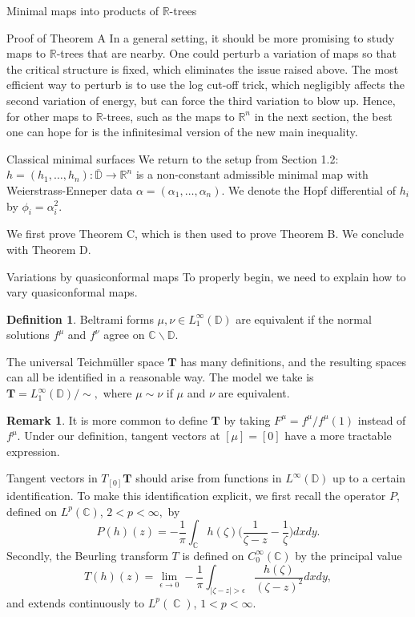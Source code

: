 \documentclass[10pt]{amsart}
\newcommand{\R}{\mathbb R}
\DeclareMathOperator{\C}{\mathbb{C}}
\theoremstyle{definition}
\newtheorem{defn}[thm]{Definition}
\newtheorem{remark}[thm]{Remark}
\begin{document}
\begin{section}{Minimal maps into products of $\R$-trees}
\begin{subsection}{Proof of Theorem A}
In a general setting, it should be more promising to study maps to $\R$-trees that are nearby. One could perturb a variation of maps so that the critical structure is fixed, which eliminates the issue raised above. The most efficient way to perturb is to use the log cut-off trick, which negligibly affects the second variation of energy, but can force the third variation to blow up. Hence, for other maps to $\R$-trees, such as the maps to $\R^n$ in the next section, the best one can hope for is the infinitesimal version of the new main inequality.
\end{subsection}


\end{section}

\begin{section}{Classical minimal surfaces}\label{r3}
We return to the setup from Section 1.2: $h=(h_1,\dots, h_n):\overline{\mathbb{D}}\to\R^n$ is a non-constant admissible minimal map with Weierstrass-Enneper data $\alpha=(\alpha_1,\dots,\alpha_n)$. We denote the Hopf differential of $h_i$ by $\phi_i=\alpha_i^2.$

We first prove Theorem C, which is then used to prove Theorem B. We conclude with Theorem D. 
\begin{subsection}{Variations by quasiconformal maps}
To properly begin, we need to explain how to vary quasiconformal maps.
\begin{defn}
Beltrami forms $\mu,\nu\in L_1^\infty(\mathbb{D})$ are equivalent if the normal solutions $f^\mu$ and $f^\nu$ agree on $\mathbb{C}\backslash\mathbb{D}.$
\end{defn}
The universal Teichm{\"u}ller space $\mathbf{T}$ has many definitions, and the resulting spaces can all be identified in a reasonable way. The model we take is $\mathbf{T}=L_1^\infty(\mathbb{D})/\sim,$ where $\mu\sim \nu$ if $\mu$ and $\nu$ are equivalent.
\begin{remark}
It is more common to define $\mathbf{T}$ by taking $F^\mu=f^\mu/f^\mu(1)$ instead of $f^\mu$. Under our definition, tangent vectors at $[\mu]=[0]$ have a more tractable expression.
\end{remark}
Tangent vectors in $T_{[0]}\mathbf{T}$ should arise from functions in $L^\infty(\mathbb{D})$ up to a certain identification. To make this identification explicit, we first recall the operator $P$, defined on $L^p(\mathbb{C})$, $2<p<\infty,$ by $$P(h)(z) = -\frac{1}{\pi}\int_{\mathbb{C}}h(\zeta)\Big (\frac{1}{\zeta-z} -\frac{1}{\zeta}\Big) dxdy.$$
Secondly, the Beurling transform $T$ is defined on $C_0^\infty(\mathbb{C})$ by the principal value $$T(h)(z) =\lim_{\epsilon\to 0} -\frac{1}{\pi}\int_{|\zeta-z|>\epsilon}\frac{h(\zeta)}{(\zeta-z)^2}dxdy,$$ and extends continuously to $L^p(\C)$, $1<p< \infty.$ 



\end{subsection}
\end{section}
\end{document}
